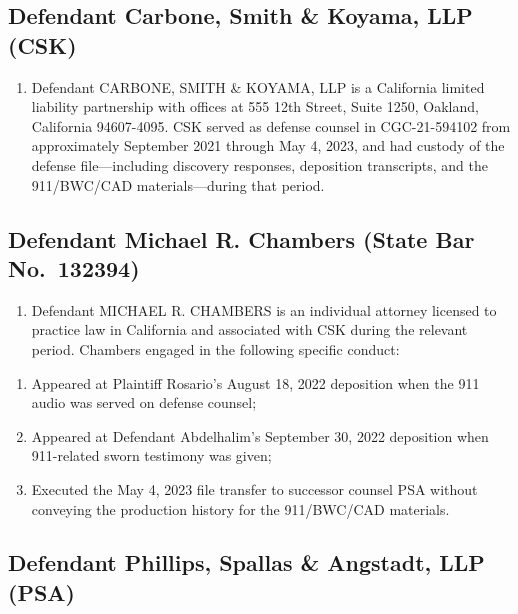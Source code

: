 \subsection{Defendant Carbone, Smith \& Koyama, LLP (CSK)}\label{defendant-carbone-smith-koyama-llp-csk}

\begin{enumerate}
\def\labelenumi{\arabic{enumi}.}
\setcounter{enumi}{41}
\tightlist
\item
  Defendant CARBONE, SMITH \& KOYAMA, LLP is a California limited liability partnership with offices at 555 12th Street, Suite 1250, Oakland, California 94607-4095. CSK served as defense counsel in CGC-21-594102 from approximately September 2021 through May 4, 2023, and had custody of the defense file---including discovery responses, deposition transcripts, and the 911/BWC/CAD materials---during that period.
\end{enumerate}

\subsection{Defendant Michael R. Chambers (State Bar No.~132394)}\label{defendant-michael-r.-chambers-state-bar-no.-132394}

\begin{enumerate}
\def\labelenumi{\arabic{enumi}.}
\setcounter{enumi}{42}
\tightlist
\item
  Defendant MICHAEL R. CHAMBERS is an individual attorney licensed to practice law in California and associated with CSK during the relevant period. Chambers engaged in the following specific conduct:
\end{enumerate}

\begin{enumerate}
\def\labelenumi{(\alph{enumi})}
\item
  Appeared at Plaintiff Rosario's August 18, 2022 deposition when the 911 audio was served on defense counsel;
\item
  Appeared at Defendant Abdelhalim's September 30, 2022 deposition when 911-related sworn testimony was given;
\item
  Executed the May 4, 2023 file transfer to successor counsel PSA without conveying the production history for the 911/BWC/CAD materials.
\end{enumerate}

\subsection{Defendant Phillips, Spallas \& Angstadt, LLP (PSA)}\label{defendant-phillips-spallas-angstadt-llp-psa}

